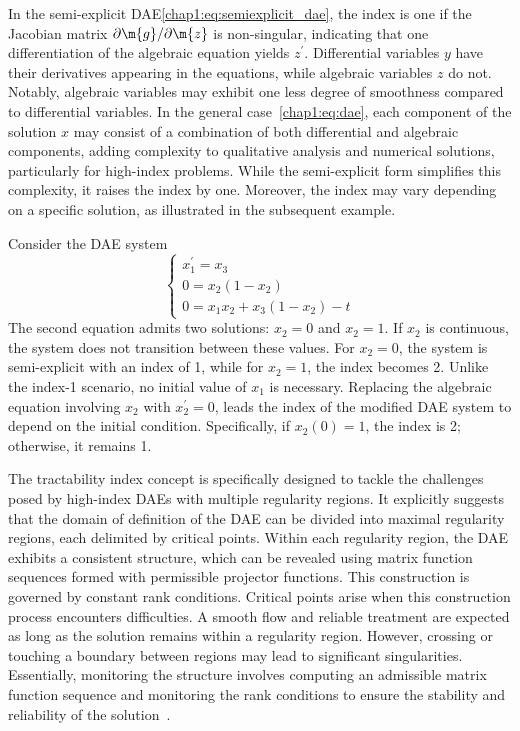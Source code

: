 In the semi-explicit \ac{DAE}\eqref{chap1:eq:semiexplicit_dae}, the index is one if the Jacobian matrix $\partial\m{g}/\partial\m{z}$ is non-singular, indicating that one differentiation of the algebraic equation yields $z^{\prime}$. Differential variables $y$ have their derivatives appearing in the equations, while algebraic variables $z$ do not. Notably, algebraic variables may exhibit one less degree of smoothness compared to differential variables. In the general case~\eqref{chap1:eq:dae}, each component of the solution $x$ may consist of a combination of both differential and algebraic components, adding complexity to qualitative analysis and numerical solutions, particularly for high-index problems. While the semi-explicit form simplifies this complexity, it raises the index by one. Moreover, the index may vary depending on a specific solution, as illustrated in the subsequent example.

\begin{example}
  Consider the \ac{DAE} system
  \begin{equation*}
    \begin{cases}
    x_1^{\prime} = x_3 \\
    0 = x_2(1 - x_2) \\
    0 = x_1x_2 + x_3(1 - x_2) - t
    \end{cases}
  \end{equation*}
  The second equation admits two solutions: $x_2 = 0$ and $x_2 = 1$. If $x_2$ is continuous, the system does not transition between these values. For $x_2 = 0$, the system is semi-explicit with an index of 1, while for $x_2 = 1$, the index becomes 2. Unlike the index-1 scenario, no initial value of $x_1$ is necessary. Replacing the algebraic equation involving $x_2$ with $x_2^{\prime} = 0$, leads the index of the modified \ac{DAE} system to depend on the initial condition. Specifically, if $x_2(0) = 1$, the index is 2; otherwise, it remains 1.
\end{example}

The tractability index concept is specifically designed to tackle the challenges posed by high-index \acp{DAE} with multiple regularity regions. It explicitly suggests that the domain of definition of the \ac{DAE} can be divided into maximal regularity regions, each delimited by critical points. Within each regularity region, the \ac{DAE} exhibits a consistent structure, which can be revealed using matrix function sequences formed with permissible projector functions. This construction is governed by constant rank conditions. Critical points arise when this construction process encounters difficulties. A smooth flow and reliable treatment are expected as long as the solution remains within a regularity region. However, crossing or touching a boundary between regions may lead to significant singularities. Essentially, monitoring the structure involves computing an admissible matrix function sequence and monitoring the rank conditions to ensure the stability and reliability of the solution~\cite{lamour2011computational}.


